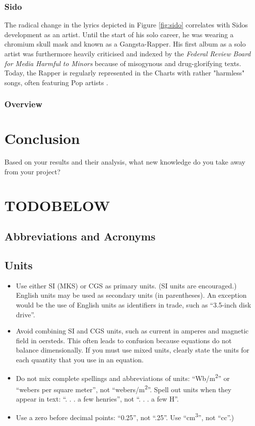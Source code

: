 \documentclass[conference]{IEEEtran}
\begin{document}
\subsubsection{Sido}
The radical change in the lyrics depicted in Figure \ref{fig:sido} correlates with Sidos development as an artist. Until the start of his solo career, he was wearing a chromium skull mask and known as a Gangsta-Rapper. His first album as a solo artist was furthermore heavily criticised and indexed \cite{urteil} by the \textit{Federal Review Board for Media Harmful to Minors} \cite{bpjm} because of misogynous and drug-glorifying texts. Today, the Rapper is regularly represented in the Charts with rather "harmless" songs, often featuring Pop artists \cite{sido_charts}.
\subsubsection{Overview}


\section{Conclusion}
Based on your results and their analysis, what new knowledge do you
take away from your project?

\section{TODOBELOW}

\subsection{Abbreviations and Acronyms}\label{AA}

\subsection{Units}
\begin{itemize}
\item Use either SI (MKS) or CGS as primary units. (SI units are encouraged.) English units may be used as secondary units (in parentheses). An exception would be the use of English units as identifiers in trade, such as ``3.5-inch disk drive''.
\item Avoid combining SI and CGS units, such as current in amperes and magnetic field in oersteds. This often leads to confusion because equations do not balance dimensionally. If you must use mixed units, clearly state the units for each quantity that you use in an equation.
\item Do not mix complete spellings and abbreviations of units: ``Wb/m\textsuperscript{2}'' or ``webers per square meter'', not ``webers/m\textsuperscript{2}''. Spell out units when they appear in text: ``. . . a few henries'', not ``. . . a few H''.
\item Use a zero before decimal points: ``0.25'', not ``.25''. Use ``cm\textsuperscript{3}'', not ``cc''.)
\end{itemize}
\end{document}
